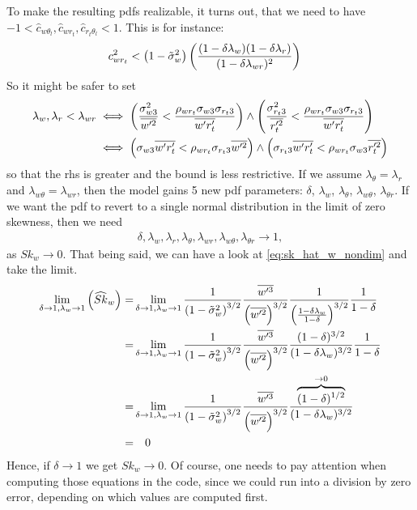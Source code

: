 To make the resulting \glspl{pdf} realizable, it turns out\autocite{larson2022clubbsilhs}, that we need to have
$-1 < \widehat{c}_{w \theta_l}, \widehat{c}_{w r_t}, \widehat{c}_{r_t \theta_l} < 1$.
This is for instance:
\begin{align}
    c_{w r_t}^2 &< \left( 1 - \tilde{\sigma}_w^2 \right) \left(
    \frac{(1-\delta \lambda_w)(1-\delta \lambda_r)}{(1-\delta \lambda_{w r})^2}
    \right)
\end{align}
So it might be safer to set
\begin{align}
    \label{eq:lambda_corr_ineq}
    \lambda_w , \lambda_r < \lambda_{w r}
    &\iff
    \left(\frac{\sigma_{w 3}^2}{\overline{w'^2}} < \frac{\rho_{w r_t} \sigma_{w 3} \sigma_{r_t 3}}{\overline{w' r_t'}}\right)
    \land
    \left(\frac{\sigma_{r_t 3}^2}{\overline{r_t'^2}} < \frac{\rho_{w r_t} \sigma_{w 3} \sigma_{r_t 3}}{\overline{w' r_t'}}\right) \nonumber\\
    &\iff
    \left(\sigma_{w 3} \overline{w' r_t'} < \rho_{w r_t} \sigma_{r_t 3} \overline{w'^2}\right)
    \land
    \left(\sigma_{r_t 3} \overline{w' r_t'} < \rho_{w r_t} \sigma_{w 3} \overline{r_t'^2}\right) \nonumber\\
\end{align}
so that the \gls{rhs} is greater and the bound is less restrictive.
If we assume $\lambda_\theta = \lambda_r$ and $\lambda_{w\theta} = \lambda_{wr}$,
then the model gains 5 new \gls{pdf} parameters:
$\delta$, $\lambda_w$, $\lambda_\theta$, $\lambda_{w \theta}$, $\lambda_{\theta r}$.
If we want the \gls{pdf} to revert to a single normal distribution in the limit of zero skewness,
then we need
\begin{align}
    \delta, \lambda_w, \lambda_r, \lambda_\theta,
    \lambda_{w r}, \lambda_{w \theta}, \lambda_{\theta r}
    \to 1,
\end{align}
as $Sk_w \to 0$.
That being said, we can have a look at \cref{eq:sk_hat_w_nondim} and take the limit.
\begin{align}
    \lim_{\delta \to 1, \lambda_w \to 1}\left(\widehat{Sk}_w\right)
    =&\lim_{\delta \to 1, \lambda_w \to 1}
    \frac{1}{\left( 1 - \tilde{\sigma}_w^2 \right)^{3/2}}
    \frac{\overline{w'^3}}{\left(\overline{w'^2} \right)^{3/2}}
    \frac{1}{\left(\frac{1-\delta \lambda_w}{1-\delta}\right)^{3/2}}
    \frac{1}{1-\delta} \nonumber \\
    =&\lim_{\delta \to 1, \lambda_w \to 1}
    \frac{1}{\left( 1 - \tilde{\sigma}_w^2 \right)^{3/2}}
    \frac{\overline{w'^3}}{\left(\overline{w'^2} \right)^{3/2}}
    \frac{(1-\delta)^{3/2}}{(1-\delta \lambda_w)^{3/2}}
    \frac{1}{1-\delta} \nonumber \\
    =&\lim_{\delta \to 1, \lambda_w \to 1}
    \frac{1}{\left( 1 - \tilde{\sigma}_w^2 \right)^{3/2}}
    \frac{\overline{w'^3}}{\left(\overline{w'^2} \right)^{3/2}}
    \frac{\overbrace{(1-\delta)^{1/2}}^{\to 0}}{(1-\delta \lambda_w)^{3/2}}
    \nonumber \\
    =& \quad 0
\end{align}
Hence, if $\delta \to 1$ we get $Sk_w \to 0$.
Of course, one needs to pay attention when computing those equations in the code,
since we could run into a division by zero error,
depending on which values are computed first.

